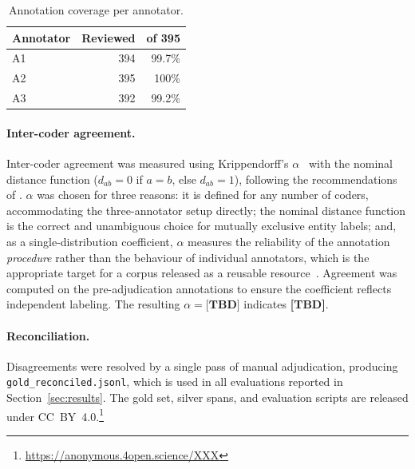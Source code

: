 \begin{table}[h]
  \caption{Annotation coverage per annotator.}
  \label{tab:gold-annotators}
  \begin{tabular}{lrr}
    \toprule
    Annotator & Reviewed & of 395 \\
    \midrule
    A1 & 394 & 99.7\% \\
    A2 & 395 & 100\%  \\
    A3 & 392 & 99.2\% \\
    \bottomrule
  \end{tabular}
\end{table}

\paragraph{Inter-coder agreement.}
Inter-coder agreement was measured using Krippendorff's
$\alpha$~\cite{krippendorff1980,krippendorff2004a} with the nominal
distance function ($d_{ab} = 0$ if $a = b$, else $d_{ab} = 1$),
following the recommendations of \citet{artstein-poesio-2008}.
$\alpha$ was chosen for three reasons: it is defined for any number of
coders, accommodating the three-annotator setup directly; the nominal
distance function is the correct and unambiguous choice for mutually
exclusive entity labels; and, as a single-distribution coefficient,
$\alpha$ measures the reliability of the annotation \emph{procedure}
rather than the behaviour of individual annotators, which is the
appropriate target for a corpus released as a reusable
resource~\cite{artstein-poesio-2008}.
Agreement was computed on the pre-adjudication annotations to ensure the
coefficient reflects independent labeling.
The resulting $\alpha = \textbf{[TBD]}$ indicates \textbf{[TBD]}.

\paragraph{Reconciliation.}
Disagreements were resolved by a single pass of manual adjudication,
producing \texttt{gold\_reconciled.jsonl}, which is used in all
evaluations reported in Section~\ref{sec:results}.
The gold set, silver spans, and evaluation scripts are released under
CC~BY~4.0.\footnote{\url{https://anonymous.4open.science/XXX}}

